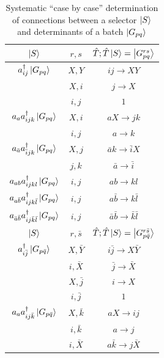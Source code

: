 \documentclass[./thesis.tex]{subfiles}
\newcommand{\Gpqrs}{\ket{G^{rs}_{pq}}}
\begin{document}
\begin{table}

\caption{Systematic ``case by case'' determination of connections between a selector $\ket S$ and determinants of a batch $\ket {G_{pq}}$} 
\label{tab:systematic_determination}
\begin{center}
	\begin{tabular}{ c|c|c }
		\hline \hline \rule{0pt}{3ex}
		$\ket S$									&$ r, s$ 	& $\hat T ; \hat T \ket S = \Gpqrs$	\\
		\hline \hline \rule{0pt}{3ex}
		$a^\dagger_{ij} \ket {G_{pq}}$						& $X,Y$ 	&$ij \rightarrow XY$		\\
											& $X,i$ 	&$j \rightarrow X$		\\
											& $i,j$ 	&$1$			\\
		\hline \rule{0pt}{3ex}
		$a_{a} a^\dagger_{ijk} \ket {G_{pq}}$				&$X,i$		&$aX \rightarrow jk$		\\
											&$i,j$		&$a \rightarrow k$		\\
		\hline \rule{0pt}{3ex}
		$a_{\bar a} a^\dagger_{\bar i jk} \ket {G_{pq}}$	&$X,j$		&$\bar a k \rightarrow \bar i X$		\\
											&$j,k$		&$\bar a \rightarrow \bar i$		\\
		\hline \rule{0pt}{3ex}
		$a_{ab} a^\dagger_{ijkl} \ket {G_{pq}}$			&$i,j$		&$ab \rightarrow kl$		\\
		\hline \rule{0pt}{3ex}
		$a_{a  \bar b} a^\dagger_{ijk \bar l} \ket {G_{pq}}$			&$i,j$		&$a \bar b \rightarrow k \bar l$		\\
		\hline \rule{0pt}{3ex}
		$a_{\bar a \bar b} a^\dagger_{i j \bar k \bar l} \ket {G_{pq}}$	&$i,j$		&$\bar a \bar b \rightarrow \bar k \bar l$		\\
		
		\hline \hline \rule{0pt}{3ex}
		$\ket S$									&$ r, \bar s$ 	& $\hat T ; \hat T \ket S = \ket {G_{p \bar q}^{r \bar s}}$	\\
		\hline \hline \rule{0pt}{3ex}
		$a^\dagger_{i \bar j} \ket {G_{p \bar q}}$				& $X, \bar Y$ 	&$i \bar j \rightarrow X \bar Y$		\\
											& $i,\bar X$ 		&$\bar j \rightarrow \bar X$		\\
											& $X,\bar j$ 	&$i \rightarrow X$		\\
											& $i,\bar j$ 	&$1$			\\
											
											
		\hline \rule{0pt}{3ex}
		$a_{a} a^\dagger_{ij \bar k} \ket {G_{p \bar q}}$		&$X,\bar k$		&$aX \rightarrow ij$		\\
											&$i,\bar k$		&$a \rightarrow j$		\\
											&$i,\bar X$		&$a \bar k \rightarrow j \bar X$		\\
											

\end{tabular}
\end{center}
\end{table}
\end{document}
